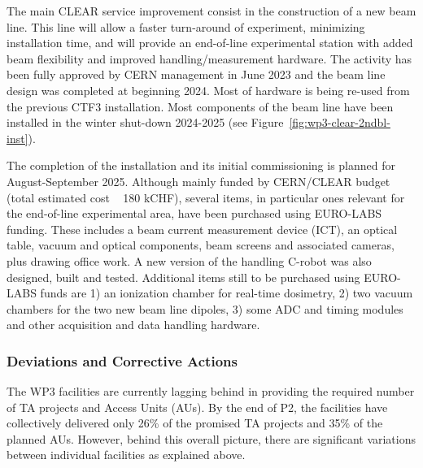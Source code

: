 {The main CLEAR service improvement consist in the construction of a new beam line. This line will allow a faster turn-around of experiment, minimizing installation time, and will provide an end-of-line experimental station with added beam flexibility and improved handling/measurement hardware. The activity has been fully approved by CERN management in June 2023 and the beam line design was completed at beginning 2024. Most of hardware is being re-used from the previous CTF3 installation. Most components of the beam line have been installed in the winter shut-down 2024-2025 (see Figure~\ref{fig:wp3-clear-2ndbl-inst}).

The completion of the installation and its initial commissioning is planned for August-September 2025. Although mainly funded by CERN/CLEAR budget (total estimated cost ~ 180 kCHF), several items, in particular ones relevant for the end-of-line experimental area, have been purchased using EURO-LABS funding. These includes a beam current measurement device (ICT), an optical table, vacuum and optical components, beam screens and associated cameras, plus drawing office work. A new version of the handling C-robot was also designed, built and tested. Additional items still to be purchased using EURO-LABS funds are 1) an ionization chamber for real-time dosimetry, 2) two vacuum chambers for the two new beam line dipoles, 3) some ADC and timing modules and other acquisition and data handling hardware.

\subsubsection*{Deviations and Corrective Actions}


The WP3 facilities are currently lagging behind in providing the required number of TA projects and Access Units (AUs). By the end of P2, the facilities have collectively delivered only 26\% of the promised TA projects and 35\% of the planned AUs. However, behind this overall picture, there are significant variations between individual facilities as explained above.

}
